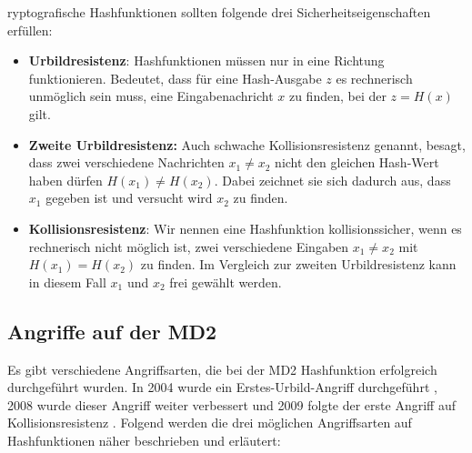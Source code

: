 \documentclass[course=erap]{aspdoc}
\begin{document}
ryptografische Hashfunktionen sollten folgende drei Sicherheitseigenschaften erfüllen: \cite{Spitz2011}

\begin{itemize}
\item \textbf{Urbildresistenz}: Hashfunktionen müssen nur in eine Richtung funktionieren. Bedeutet, dass für eine Hash-Ausgabe $z$ es rechnerisch unmöglich sein muss, eine Eingabenachricht $x$ zu finden, bei der $z = H(x)$ gilt.
\item \textbf{Zweite Urbildresistenz:} Auch schwache Kollisionsresistenz genannt, besagt, dass zwei verschiedene Nachrichten $x_{1} \neq x_{2}$ nicht den gleichen Hash-Wert haben dürfen $H(x_{1}) \neq H(x_{2})$. Dabei zeichnet sie sich dadurch aus, dass $x_{1}$ gegeben ist und versucht wird $x_{2}$ zu finden.
\item \textbf{Kollisionsresistenz}: Wir nennen eine Hashfunktion kollisionssicher, wenn es rechnerisch nicht möglich ist, zwei verschiedene Eingaben $x_{1} \neq x_{2}$ mit $H(x_{1}) = H(x_{2})$ zu finden. Im Vergleich zur zweiten Urbildresistenz kann in diesem Fall $x_{1}$ und $x_{2}$ frei gewählt werden.
\end{itemize}

\subsection{Angriffe auf der MD2}

Es gibt verschiedene Angriffsarten, die bei der MD2 Hashfunktion erfolgreich durchgeführt wurden. In 2004 wurde ein Erstes-Urbild-Angriff durchgeführt \cite{attack}, 2008 wurde dieser Angriff weiter verbessert \cite{preimageattack} und 2009 folgte der erste Angriff auf Kollisionsresistenz \cite{urbild}. Folgend werden die drei möglichen Angriffsarten auf Hashfunktionen näher beschrieben und erläutert:
\end{document}
